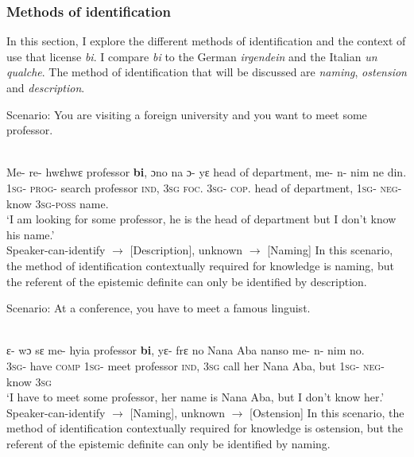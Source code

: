 \documentclass[output=paper,modfonts,nonflat,draftmode]{langsci/langscibook}
\begin{document}
\subsubsection{Methods of identification}
In this section, I explore the different methods of identification and the context of use that license \emph{bi}. I compare \emph{bi} to the German \emph{irgendein} and the Italian \emph{un qualche}. The method of identification that will be discussed are \emph{naming}, \emph{ostension} and \emph{description}.


Scenario: You are visiting a foreign university and you want to meet some professor.

\ea\label{owusu:ex45a}\\
\gll Me- re- hwεhwε professor \textbf{bi}, ɔno na ɔ- yε head of department, me- n- nim ne din.\\
\textsc{1sg}- \textsc{prog}- search professor \textsc{ind}, \textsc{3sg} \textsc{foc}. \textsc{3sg}- \textsc{cop}. head of department, \textsc{1sg}- \textsc{neg}- know \textsc{3sg}-\textsc{poss} name.\\
\glt `I am looking for some professor, he is the head of department but I don't know his name.'\\
	Speaker-can-identify $\rightarrow$ [Description], unknown $\rightarrow$  [Naming]
 \z  In this scenario, the method of identification contextually required for knowledge is naming, but the referent of the epistemic definite can only be identified by description.
 
Scenario: At a conference, you have to meet a famous linguist.

\ea\label{owusu:ex45b}\\
\gll ε- wɔ  sε me- hyia professor \textbf{bi}, yε- frε no Nana Aba nanso me- n- nim no.\\
\textsc{3sg}- have \textsc{comp} \textsc{1sg}- meet professor \textsc{ind}, \textsc{3sg} call her Nana Aba, but \textsc{1sg}- \textsc{neg}- know \textsc{3sg}\\
\glt `I have to meet some professor, her name is Nana Aba, but I don't know her.'\\
	Speaker-can-identify $\rightarrow$ [Naming], unknown $\rightarrow$  [Ostension]
 \z In this scenario, the method of identification contextually required for knowledge is ostension, but the referent of the epistemic definite can only be identified by naming.
\end{document}
